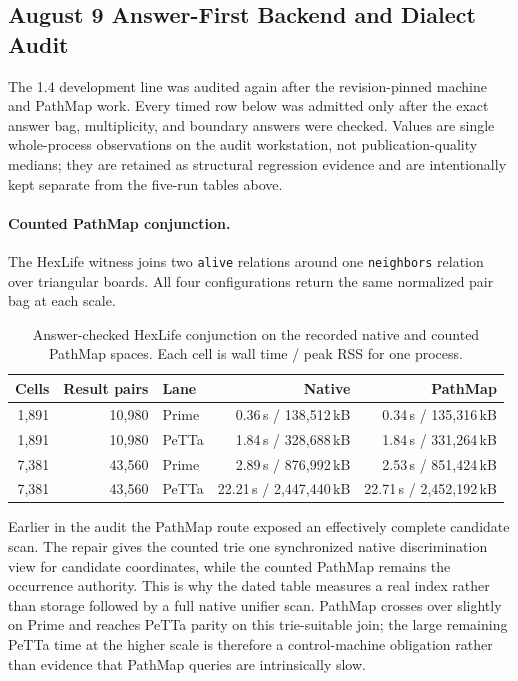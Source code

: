 \documentclass[11pt]{article}
\newcommand{\code}[1]{\texttt{#1}}
\newcommand{\PeTTa}{\textup{PeTTa}}
\newcommand{\PathMap}{\textup{PathMap}}
\begin{document}
\subsection{August 9 Answer-First Backend and Dialect Audit}
\label{sec:august-backend-audit}

The 1.4 development line was audited again after the revision-pinned
machine and \PathMap{} work.  Every timed row below was admitted only after
the exact answer bag, multiplicity, and boundary answers were checked.
Values are single whole-process observations on the audit workstation, not
publication-quality medians; they are retained as structural regression
evidence and are intentionally kept separate from the five-run tables above.

\paragraph{Counted \PathMap{} conjunction.}
The HexLife witness joins two \code{alive} relations around one
\code{neighbors} relation over triangular boards.
All four configurations return the same normalized pair bag at each scale.

\begin{table}[htbp]
\centering
\begin{tabular}{rrlrr}
\toprule
Cells & Result pairs & Lane & Native & \PathMap{} \\
\midrule
1{,}891 & 10{,}980 & Prime & 0.36\,s / 138{,}512\,kB & 0.34\,s / 135{,}316\,kB \\
1{,}891 & 10{,}980 & \PeTTa{} & 1.84\,s / 328{,}688\,kB & 1.84\,s / 331{,}264\,kB \\
7{,}381 & 43{,}560 & Prime & 2.89\,s / 876{,}992\,kB & 2.53\,s / 851{,}424\,kB \\
7{,}381 & 43{,}560 & \PeTTa{} & 22.21\,s / 2{,}447{,}440\,kB & 22.71\,s / 2{,}452{,}192\,kB \\
\bottomrule
\end{tabular}
\caption{Answer-checked HexLife conjunction on the recorded native and counted
\PathMap{} spaces.  Each cell is wall time / peak RSS for one process.}
\label{tab:hexlife-pathmap-current}
\end{table}

Earlier in the audit the \PathMap{} route exposed an effectively complete
candidate scan.  The repair gives the counted trie one synchronized native
discrimination view for candidate coordinates, while the counted \PathMap{}
remains the occurrence authority.  This is why the dated table measures a
real index rather than storage followed by a full native unifier scan.
\PathMap{} crosses over slightly on Prime and reaches \PeTTa{} parity on this
trie-suitable join; the large remaining \PeTTa{} time at the higher scale is
therefore a control-machine obligation rather than evidence that \PathMap{}
queries are intrinsically slow.
\end{document}
